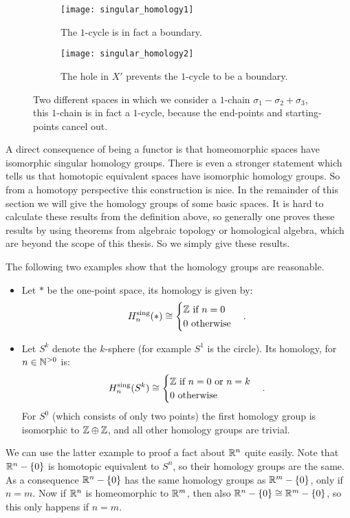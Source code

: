 \begin{figure}[h!]
\begin{subfigure}{.5\textwidth}
  \centering
  \texttt{[image: singular\_homology1]}
  \caption{The $1$-cycle is in fact a boundary.}
\end{subfigure}%
\begin{subfigure}{.5\textwidth}
  \centering
  \texttt{[image: singular\_homology2]}
  \caption{The hole in $X'$ prevents the $1$-cycle to be a boundary.}
\end{subfigure}
\caption{Two different spaces in which we consider a $1$-chain $\sigma_1-\sigma_2+\sigma_3$, this $1$-chain is in fact a $1$-cycle, because the end-points and starting-points cancel out.}
\label{fig:singular_homology}
\end{figure}

A direct consequence of being a functor is that homeomorphic spaces have isomorphic singular homology groups. There is even a stronger statement which tells us that homotopic equivalent spaces have isomorphic homology groups. So from a homotopy perspective this construction is nice. In the remainder of this section we will give the homology groups of some basic spaces. It is hard to calculate these results from the definition above, so generally one proves these results by using theorems from algebraic topology or homological algebra, which are beyond the scope of this thesis. So we simply give these results.

\begin{example}
The following two examples show that the homology groups are reasonable.
\begin{itemize}
	\item Let $\ast$ be the one-point space, its homology is given by:
	$$ H^\text{sing}_n(\ast) \cong
	\begin{cases}
		\mathbb{Z} \text{ if } n = 0 \\
		0 \text { otherwise}
	\end{cases}. $$
	\item Let $S^k$ denote the $k$-sphere (for example $S^1$ is the circle). Its homology, for $n \in {\mathbb{N}^{>0}}$ is:
	$$ H^\text{sing}_n(S^k) \cong
	\begin{cases}
		\mathbb{Z} \text{ if } n = 0 \text { or } n = k \\
		0 \text { otherwise}
	\end{cases}. $$
	For $S^0$ (which consists of only two points) the first homology group is isomorphic to $\mathbb{Z} \oplus \mathbb{Z}$, and all other homology groups are trivial.
\end{itemize}
We can use the latter example to proof a fact about $\mathbb{R}^n$ quite easily. Note that $\mathbb{R}^n - \{0\}$ is homotopic equivalent to $S^n$, so their homology groups are the same. As a consequence $\mathbb{R}^n - \{0\}$ has the same homology groups as $\mathbb{R}^m - \{0\}$, only if $n=m$. Now if $\mathbb{R}^n$ is homeomorphic to $\mathbb{R}^m$, then also $\mathbb{R}^n - \{0\} \cong \mathbb{R}^m - \{0\}$, so this only happens if $n=m$.
\end{example}
